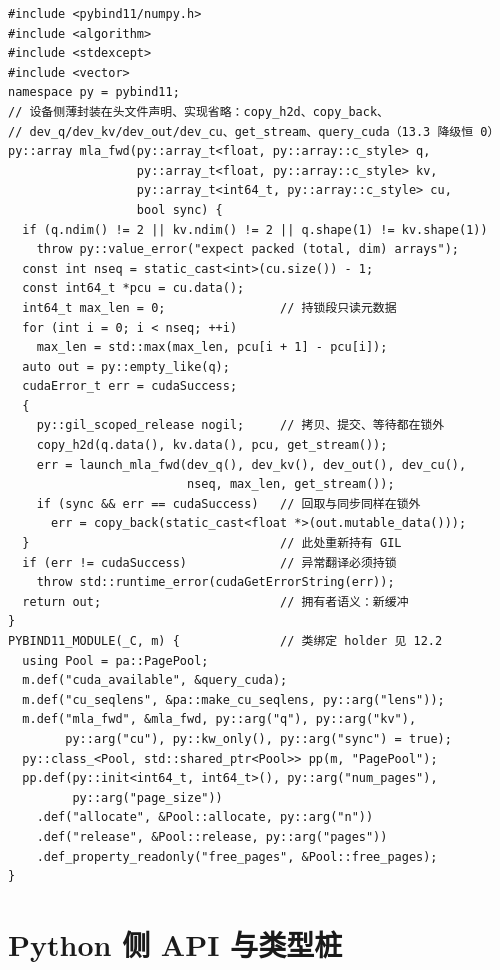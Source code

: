 \documentclass[12pt,a4paper,fontset=fandol]{ctexbook}
\begin{document}
\begin{lstlisting}[style=cppstyle,caption={bind/bindings.cpp：算子绑定与类绑定},label={lst:bind}]
#include <pybind11/numpy.h>
#include <algorithm>
#include <stdexcept>
#include <vector>
namespace py = pybind11;
// 设备侧薄封装在头文件声明、实现省略：copy_h2d、copy_back、
// dev_q/dev_kv/dev_out/dev_cu、get_stream、query_cuda（13.3 降级恒 0）
py::array mla_fwd(py::array_t<float, py::array::c_style> q,
                  py::array_t<float, py::array::c_style> kv,
                  py::array_t<int64_t, py::array::c_style> cu,
                  bool sync) {
  if (q.ndim() != 2 || kv.ndim() != 2 || q.shape(1) != kv.shape(1))
    throw py::value_error("expect packed (total, dim) arrays");
  const int nseq = static_cast<int>(cu.size()) - 1;
  const int64_t *pcu = cu.data();
  int64_t max_len = 0;                // 持锁段只读元数据
  for (int i = 0; i < nseq; ++i)
    max_len = std::max(max_len, pcu[i + 1] - pcu[i]);
  auto out = py::empty_like(q);
  cudaError_t err = cudaSuccess;
  {
    py::gil_scoped_release nogil;     // 拷贝、提交、等待都在锁外
    copy_h2d(q.data(), kv.data(), pcu, get_stream());
    err = launch_mla_fwd(dev_q(), dev_kv(), dev_out(), dev_cu(),
                         nseq, max_len, get_stream());
    if (sync && err == cudaSuccess)   // 回取与同步同样在锁外
      err = copy_back(static_cast<float *>(out.mutable_data()));
  }                                   // 此处重新持有 GIL
  if (err != cudaSuccess)             // 异常翻译必须持锁
    throw std::runtime_error(cudaGetErrorString(err));
  return out;                         // 拥有者语义：新缓冲
}
PYBIND11_MODULE(_C, m) {              // 类绑定 holder 见 12.2
  using Pool = pa::PagePool;
  m.def("cuda_available", &query_cuda);
  m.def("cu_seqlens", &pa::make_cu_seqlens, py::arg("lens"));
  m.def("mla_fwd", &mla_fwd, py::arg("q"), py::arg("kv"),
        py::arg("cu"), py::kw_only(), py::arg("sync") = true);
  py::class_<Pool, std::shared_ptr<Pool>> pp(m, "PagePool");
  pp.def(py::init<int64_t, int64_t>(), py::arg("num_pages"),
         py::arg("page_size"))
    .def("allocate", &Pool::allocate, py::arg("n"))
    .def("release", &Pool::release, py::arg("pages"))
    .def_property_readonly("free_pages", &Pool::free_pages);
}
\end{lstlisting}

\section{Python 侧 API 与类型桩}
\end{document}
